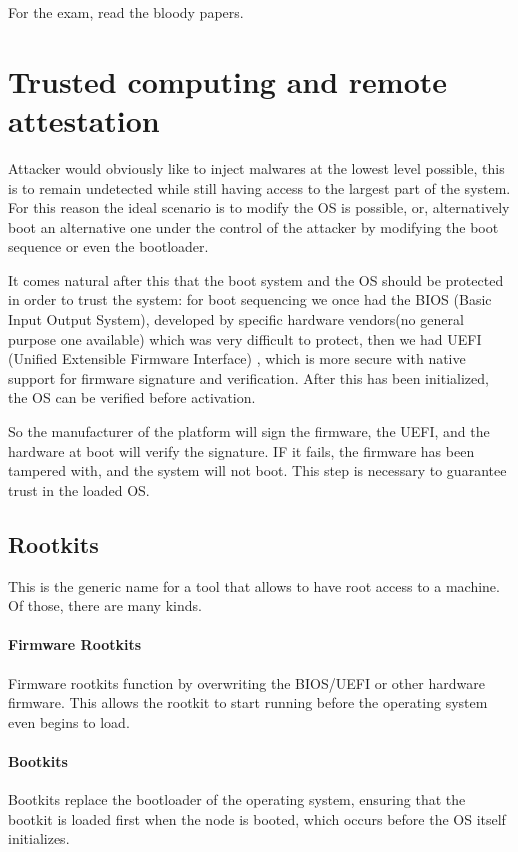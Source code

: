 \begin{boxH}
  For the exam, read the bloody papers.
\end{boxH}

\section{Trusted computing and remote attestation}
Attacker would obviously like to inject malwares at the lowest level
possible, this is to remain undetected while still having access to
the largest part of the system. For this reason the ideal scenario is
to modify the OS is possible, or, alternatively boot an alternative
one under the control of the attacker by modifying the boot sequence
or even the bootloader.

It comes natural after this that the boot system and the OS should be
protected in order to trust the system: for boot sequencing we once
had the BIOS (Basic Input Output System), developed by specific
hardware vendors(no general purpose one available) which was very
difficult to protect, then we had UEFI (Unified Extensible Firmware
Interface) , which is more secure with native support for firmware
signature and verification. After this has been initialized, the OS
can be verified before activation.

So the manufacturer of the platform will sign the firmware, the UEFI,
and the hardware at boot will verify the signature. IF it fails, the
firmware has been tampered with, and the system will not boot. This
step is necessary to guarantee trust in the loaded OS.

\subsection{Rootkits}
This is the generic name for a tool that allows to have root access to
a machine. Of those, there are many kinds.

\paragraph{Firmware Rootkits} Firmware rootkits function by
overwriting the BIOS/UEFI or other hardware firmware. This allows the
rootkit to start running before the operating system even begins to
load.

\paragraph{Bootkits} Bootkits replace the bootloader of the operating
system, ensuring that the bootkit is loaded first when the node is
booted, which occurs before the OS itself initializes.

